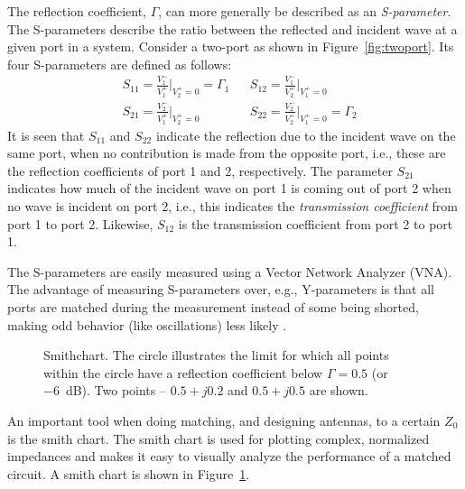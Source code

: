 The reflection coefficient, $\Gamma$, can more generally be described as an \emph{S-parameter}. The S-parameters describe the ratio between the reflected and incident wave at a given port in a system. Consider a two-port as shown in Figure~\ref{fig:twoport}. Its four S-parameters are defined as follows:
\begin{align*}
    &S_{11} = \frac{V_1^-}{V_1^+} \Bigg|_{V_2^+=0} = \Gamma_1
    &&S_{12} = \frac{V_1^-}{V_2^+} \Bigg|_{V_1^+=0} \\
    &S_{21} = \frac{V_2^-}{V_1^+} \Bigg|_{V_2^+=0}
    &&S_{22} = \frac{V_2^-}{V_2^+} \Bigg|_{V_1^+=0} = \Gamma_2
\end{align*}
It is seen that $S_{11}$ and $S_{22}$ indicate the reflection due to the incident wave on the same port, when no contribution is made from the opposite port, i.e., these are the reflection coefficients of port 1 and 2, respectively. The parameter $S_{21}$ indicates how much of the incident wave on port 1 is coming out of port 2 when no wave is incident on port 2, i.e., this indicates the \emph{transmission coefficient} from port 1 to port 2. Likewise, $S_{12}$ is the transmission coefficient from port 2 to port 1.

The S-parameters are easily measured using a Vector Network Analyzer (VNA). The advantage of measuring S-parameters over, e.g., Y-parameters is that all ports are matched during the measurement instead of some being shorted, making odd behavior (like oscillations) less likely \cite{Bowick2007}.

\begin{figure}[htbp]
    \centering
    \caption{Smithchart. The circle illustrates the limit for which all points within the circle have a reflection coefficient below $\Gamma=0.5$ (or \SI{-6}{dB}). Two points -- $0.5+j0.2$ and $0.5+j0.5$ are shown.}
    \label{fig:smithchart}
\end{figure}
An important tool when doing matching, and designing antennas, to a certain $Z_0$ is the smith chart. The smith chart is used for plotting complex, normalized impedances and makes it easy to visually analyze the performance of a matched circuit. A smith chart is shown in Figure~\ref{fig:smithchart}.

